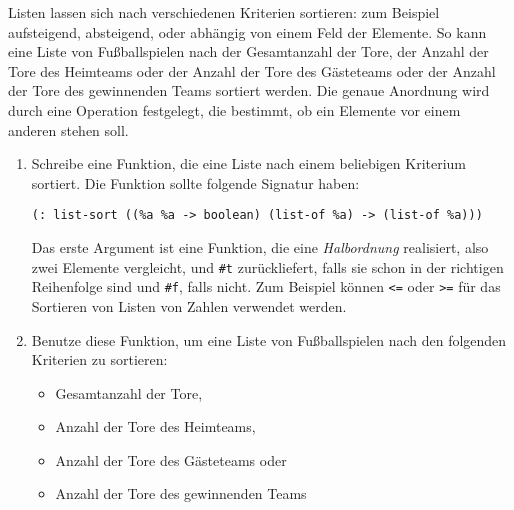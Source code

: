 \begin{aufgabe}
  Listen lassen sich nach verschiedenen Kriterien
  sortieren: zum Beispiel aufsteigend, absteigend, oder abhängig von
  einem Feld der Elemente.  So kann eine Liste von Fußballspielen nach
  der Gesamtanzahl der Tore, der Anzahl der Tore des Heimteams oder
  der Anzahl der Tore des Gästeteams oder der Anzahl der Tore des
  gewinnenden Teams sortiert werden.  Die genaue Anordnung wird durch
  eine Operation festgelegt, die bestimmt, ob ein Elemente vor einem anderen
  stehen soll.

\begin{enumerate}
\item Schreibe eine Funktion, die eine Liste nach einem beliebigen
  Kriterium sortiert.  Die Funktion sollte folgende Signatur haben:

\begin{lstlisting}
(: list-sort ((%a %a -> boolean) (list-of %a) -> (list-of %a)))
\end{lstlisting}

  Das erste Argument ist eine Funktion, die eine \textit{Halbordnung}
  realisiert, also zwei Elemente vergleicht, und \verb|#t|
  zurückliefert, falls sie schon in der richtigen Reihenfolge sind und
  \verb|#f|, falls nicht.  Zum Beispiel können \verb|<=| oder \verb|>=|
  für das Sortieren von Listen von Zahlen verwendet werden.
\item Benutze diese Funktion, um eine Liste von
  Fußballspielen nach den folgenden Kriterien zu sortieren:
  \begin{itemize}
  \item Gesamtanzahl der Tore,
  \item Anzahl der Tore des Heimteams,
  \item Anzahl der Tore des Gästeteams oder
  \item Anzahl der Tore des
    gewinnenden Teams
  \end{itemize}
\end{enumerate}
\end{aufgabe}

